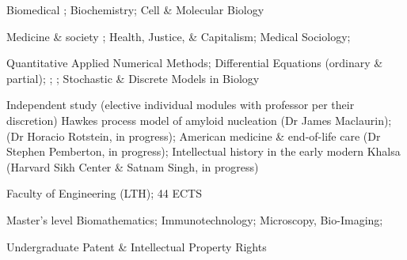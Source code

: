 \documentclass[a4paper,11pt]{article}  %
\begin{document}
\begin{modules}
  \item[Biomedical] ; Biochemistry; Cell \& Molecular Biology
  \item[Medicine \& society] ; Health, Justice, \& Capitalism; Medical Sociology; 
  \item[Quantitative] Applied Numerical Methods; Differential Equations (ordinary \& partial); ; ; Stochastic \& Discrete Models in Biology
  \item[Independent study (elective individual modules with professor per their discretion)] Hawkes process model of amyloid nucleation (Dr James Maclaurin);  (Dr Horacio Rotstein, in progress); American medicine \& end-of-life care (Dr Stephen Pemberton, in progress); Intellectual history in the early modern Khalsa (Harvard Sikh Center \& Satnam Singh, in progress)
\end{modules}

      {Faculty of Engineering (LTH); 44 ECTS}{}
\begin{modules}
  \item[Master's level] Biomathematics; Immunotechnology; Microscopy, Bio-Imaging; 
  \item[Undergraduate] Patent \& Intellectual Property Rights
\end{modules}

\end{document}
